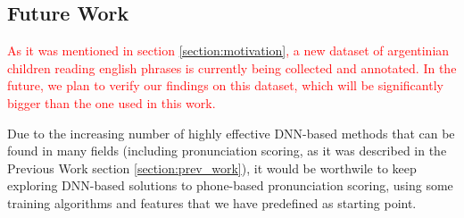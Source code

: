 \subsection{Future Work}

\textcolor{red}{
As it was mentioned in section \ref{section:motivation}, a new dataset of
argentinian children reading english phrases is currently being collected
and annotated. In the future, we plan to verify our findings on
this dataset, which will be significantly bigger than the one used in this work.
}



Due to the increasing number of highly effective DNN-based methods that can be found in
many fields (including pronunciation scoring,
as it was described in the Previous Work section \ref{section:prev_work}),
it would be worthwile to
keep exploring DNN-based solutions to phone-based pronunciation scoring, using
some training algorithms and features that we have predefined as starting point.


